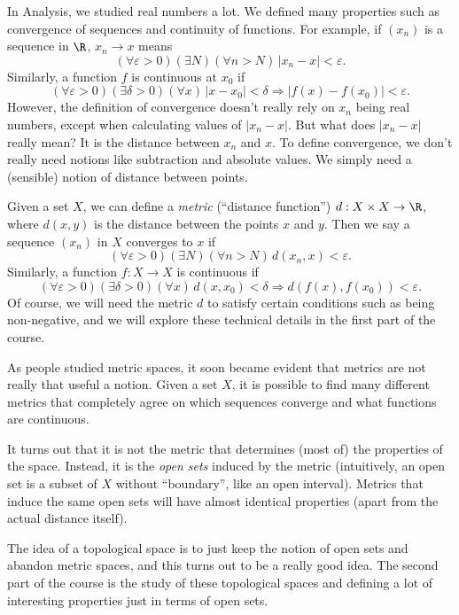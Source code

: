 \documentclass[a4paper]{article}
\begin{document}
In Analysis, we studied real numbers a lot. We defined many properties such as convergence of sequences and continuity of functions. For example, if $(x_n)$ is a sequence in $\R$, $x_n \to x$ means
\[
  (\forall \varepsilon > 0)(\exists N)(\forall n > N)\, |x_n - x| < \varepsilon.
\]
Similarly, a function $f$ is continuous at $x_0$ if
\[
  (\forall \varepsilon > 0)(\exists \delta > 0)(\forall x)\,|x - x_0| < \delta \Rightarrow  |f(x) - f(x_0)| < \varepsilon.
\]
However, the definition of convergence doesn't really rely on $x_n$ being real numbers, except when calculating values of $|x_n - x|$. But what does $|x_n - x|$ really mean? It is the distance between $x_n$ and $x$. To define convergence, we don't really need notions like subtraction and absolute values. We simply need a (sensible) notion of distance between points.

Given a set $X$, we can define a \emph{metric} (``distance function'') $d: X\times X\to \R$, where $d(x, y)$ is the distance between the points $x$ and $y$. Then we say a sequence $(x_n)$ in $X$ converges to $x$ if
\[
  (\forall \varepsilon > 0)(\exists N)(\forall n > N)\, d(x_n, x) < \varepsilon.
\]
Similarly, a function $f: X\to X$ is continuous if
\[
  (\forall \varepsilon > 0)(\exists \delta > 0)(\forall x)\,d(x, x_0) < \delta \Rightarrow  d(f(x), f(x_0)) < \varepsilon.
\]
Of course, we will need the metric $d$ to satisfy certain conditions such as being non-negative, and we will explore these technical details in the first part of the course.

As people studied metric spaces, it soon became evident that metrics are not really that useful a notion. Given a set $X$, it is possible to find many different metrics that completely agree on which sequences converge and what functions are continuous.

It turns out that it is not the metric that determines (most of) the properties of the space. Instead, it is the \emph{open sets} induced by the metric (intuitively, an open set is a subset of $X$ without ``boundary'', like an open interval). Metrics that induce the same open sets will have almost identical properties (apart from the actual distance itself). 

The idea of a topological space is to just keep the notion of open sets and abandon metric spaces, and this turns out to be a really good idea. The second part of the course is the study of these topological spaces and defining a lot of interesting properties just in terms of open sets.
\end{document}
